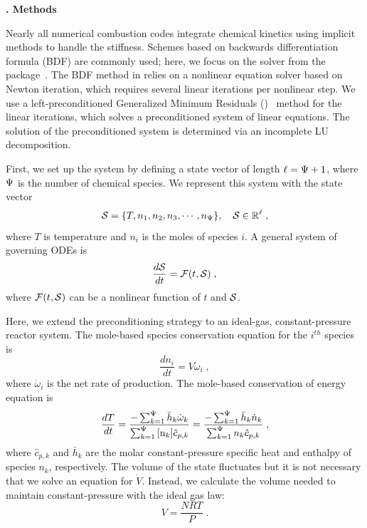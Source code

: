 \documentclass[twocolumn,10pt]{article}
\renewcommand{\section}%
              [1]%
              {%
               \bgroup%
               \flushleft%
               \small\bf%
               \stepcounter{section}%
               \arabic{section}. #1%
               \par%
               \egroup%
              }%
\newcommand{\sectionOne}[1]{\section{#1} \addvspace{10pt}}
\begin{document}
\sectionOne{Methods}
\label{p1:methods-section}

Nearly all numerical combustion codes integrate chemical kinetics using implicit methods to handle the stiffness.
Schemes based on backwards differentiation formula (BDF) are commonly used; here, we focus on the \cvodes{} solver from the \sundials{} package~\cite{cohen_cvode_1996, hindmarsh_sundials_2005}.
The BDF method in \cvodes{} relies on a nonlinear equation solver based on Newton iteration, which requires several linear iterations per nonlinear step.
We use a left-preconditioned Generalized Minimum Residuals (\gmres{})~\cite{trefethen_numerical_1997} method for the linear iterations, which solves a preconditioned system of linear equations.
The solution of the preconditioned system is determined via an incomplete LU decomposition.

First, we set up the system by defining a state vector of length $\ell = \nspecies + 1$, where $\nspecies$ is the number of chemical species.
We represent this system with the state vector
\begin{equation}
    \S{} = \{T, n_1, n_2, n_3, \cdots, n_{\nspecies}\},\quad\S{}\in\mathbb{R}^\ell \;,
\end{equation}
where $T$ is temperature and $n_i$ is the moles of species $i$.
A general system of governing ODEs is
\begin{equation}
    \label{eq:ode-system}
    \frac{d\S{}}{dt} = \F{t,\S{}} \;,
\end{equation}
where $\F{t,\S{}}$ can be a nonlinear function of $t$ and $\S{}$.

Here, we extend the preconditioning strategy to an ideal-gas, constant-pressure reactor system.
The mole-based species conservation equation for the $i^{th}$ species is
\begin{equation}
    \label{eq:species-cons}
    \frac{dn_i}{dt} = V \dot{\omega}_{i} \;,
\end{equation}
where $\dot{\omega}_{i}$ is the net rate of production.
The mole-based conservation of energy equation is
\begin{equation}
    \label{eq:mole-energy}
    \frac{dT}{dt} = \frac{-\SpecSum{\bar{h}_k\dot{\omega}_k}}{\SpecSum{\conc{n_k} \hat{c}_{p,k}}} = \frac{-\SpecSum{\bar{h}_k\dot{n}_k}}{ \SpecSum{n_k \hat{c}_{p,k}}}\;,
\end{equation}
where $\hat{c}_{p,k}$ and $\bar{h}_k$ are the molar constant-pressure specific heat and enthalpy of species $n_k$, respectively.
The volume of the state fluctuates but it is not necessary that we solve an equation for $\dot{V}$. Instead, we calculate the volume needed to maintain constant-pressure with the ideal gas law:
\begin{equation}
    \label{eq:ideal_gas_law}
    V = \frac{NRT}{P} \;.
\end{equation}
\end{document}
